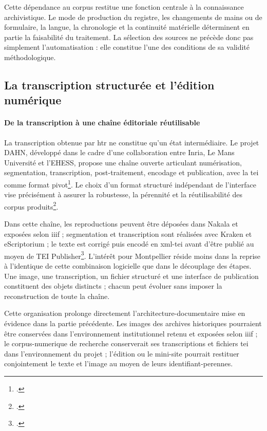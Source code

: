 Cette dépendance au corpus restitue une fonction centrale à la connaissance archivistique. Le mode de production du registre, les changements de mains ou de formulaire, la langue, la chronologie et la continuité matérielle déterminent en partie la faisabilité du traitement. La sélection des sources ne précède donc pas simplement l'automatisation : elle constitue l'une des conditions de sa validité méthodologique.



\subsection{La transcription structurée et l'édition numérique}

\paragraph{De la transcription à une chaîne éditoriale réutilisable}

La transcription obtenue par \gls{htr} ne constitue qu'un état intermédiaire. Le projet DAHN, développé dans le cadre d'une collaboration entre Inria, Le Mans Université et l'EHESS, propose une chaîne ouverte articulant numérisation, segmentation, transcription, post-traitement, encodage et publication, avec la \gls{tei} comme format pivot\footcite{Chiffoleau2024TEIPipeline}. Le choix d'un format structuré indépendant de l'interface vise précisément à assurer la robustesse, la pérennité et la réutilisabilité des corpus produits\footcite{Chiffoleau2024TEIPipeline}.

Dans cette chaîne, les reproductions peuvent être déposées dans Nakala et exposées selon \gls{iiif} ; segmentation et transcription sont réalisées avec Kraken et eScriptorium ; le texte est corrigé puis encodé en \gls{xml}-\gls{tei} avant d'être publié au moyen de TEI Publisher\footcite{Chiffoleau2024TEIPipeline}. L'intérêt pour Montpellier réside moins dans la reprise à l'identique de cette combinaison logicielle que dans le découplage des étapes. Une image, une transcription, un fichier structuré et une interface de publication constituent des objets distincts ; chacun peut évoluer sans imposer la reconstruction de toute la chaîne.

Cette organisation prolonge directement l'\gls{architecture-documentaire} mise en évidence dans la partie précédente. Les images des archives historiques pourraient être conservées dans l'environnement institutionnel retenu et exposées selon \gls{iiif} ; le \gls{corpus-numerique} de recherche conserverait ses transcriptions et fichiers \gls{tei} dans l'environnement du projet ; l'édition ou le mini-site pourrait restituer conjointement le texte et l'image au moyen de leurs \glspl{identifiant-perenne}.

